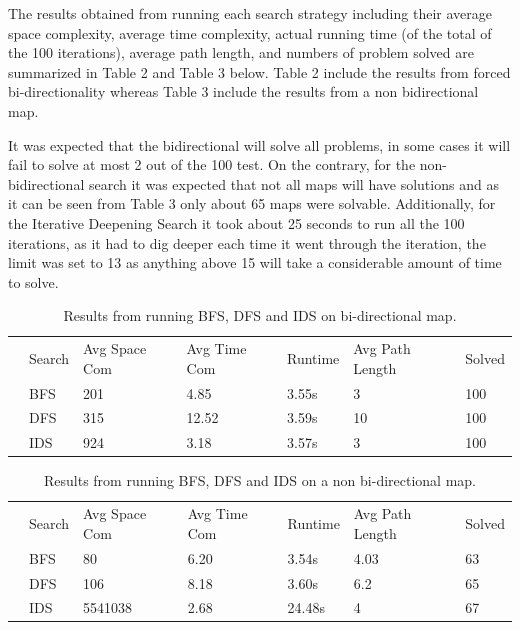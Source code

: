 \documentclass[12pt, letter]{article}
\begin{document}
\FloatBarrier

The results obtained from running each search strategy including their average space complexity, average time complexity, actual running time (of the total of the 100 iterations), average path length, and numbers of problem solved are summarized in Table 2 and Table 3 below. Table 2 include the results from forced bi-directionality whereas Table 3 include the results from a non bidirectional map. 

It was expected that the bidirectional will solve all problems, in some cases it will fail to solve at most 2 out of the 100 test. On the contrary, for the non-bidirectional search it was expected that not all maps will have solutions and as it can be seen from Table 3 only about 65 maps were solvable. Additionally, for the Iterative Deepening Search it took about 25 seconds to run all the 100 iterations, as it had to dig deeper each time it went through the iteration, the limit was set to 13 as anything above 15 will take a considerable amount of time to solve. 

\begin{table}[htb]
\centering
\caption{Results from running BFS, DFS and IDS on bi-directional map.}
\label{my-label}
\begin{tabular}{lllllll}
 & Search & Avg Space Com & Avg Time Com & Runtime & Avg Path Length & Solved \\
 & BFS         & 201                  & 4.85                & 3.55s              & 3               & 100    \\
 & DFS         & 315                  & 12.52               & 3.59s              & 10              & 100    \\
 & IDS         & 924                  & 3.18                & 3.57s              & 3               & 100   
\end{tabular}
\end{table}

\begin{table}[htb]
\centering
\caption{Results from running BFS, DFS and IDS on a non bi-directional map.}
\label{my-label}
\begin{tabular}{lllllll}
 & Search & Avg Space Com & Avg Time Com & Runtime & Avg Path Length & Solved \\
 & BFS         & 80                   & 6.20                & 3.54s              & 4.03            & 63     \\
 & DFS         & 106                  & 8.18                & 3.60s              & 6.2             & 65     \\
 & IDS         & 5541038              & 2.68                & 24.48s             & 4               & 67    
\end{tabular}
\end{table}
\end{document}
